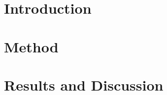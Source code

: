 \documentclass{article}
\begin{document}
\section{Introduction}


\section{Method}


\section{Results and Discussion}






\end{document}
